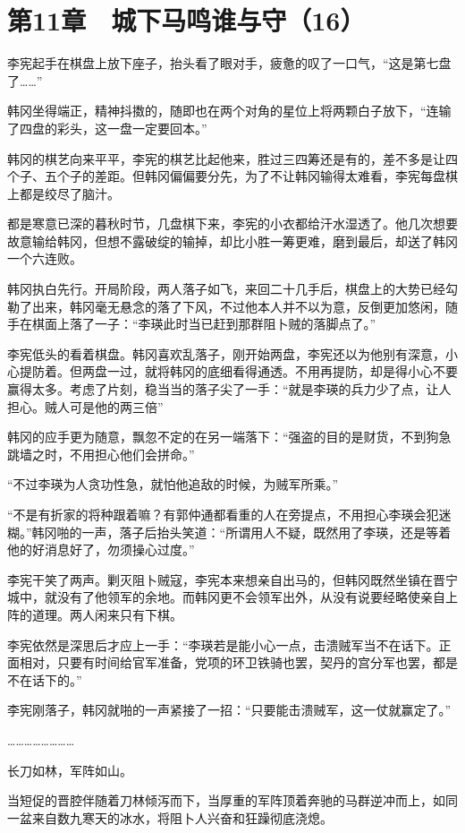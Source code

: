 \section{第11章　城下马鸣谁与守（16）}

李宪起手在棋盘上放下座子，抬头看了眼对手，疲惫的叹了一口气，“这是第七盘了……”

韩冈坐得端正，精神抖擞的，随即也在两个对角的星位上将两颗白子放下，“连输了四盘的彩头，这一盘一定要回本。”

韩冈的棋艺向来平平，李宪的棋艺比起他来，胜过三四筹还是有的，差不多是让四个子、五个子的差距。但韩冈偏偏要分先，为了不让韩冈输得太难看，李宪每盘棋上都是绞尽了脑汁。

都是寒意已深的暮秋时节，几盘棋下来，李宪的小衣都给汗水湿透了。他几次想要故意输给韩冈，但想不露破绽的输掉，却比小胜一筹更难，磨到最后，却送了韩冈一个六连败。

韩冈执白先行。开局阶段，两人落子如飞，来回二十几手后，棋盘上的大势已经勾勒了出来，韩冈毫无悬念的落了下风，不过他本人并不以为意，反倒更加悠闲，随手在棋面上落了一子：“李瑛此时当已赶到那群阻卜贼的落脚点了。”

李宪低头的看着棋盘。韩冈喜欢乱落子，刚开始两盘，李宪还以为他别有深意，小心提防着。但两盘一过，就将韩冈的底细看得通透。不用再提防，却是得小心不要赢得太多。考虑了片刻，稳当当的落子尖了一手：“就是李瑛的兵力少了点，让人担心。贼人可是他的两三倍”

韩冈的应手更为随意，飘忽不定的在另一端落下：“强盗的目的是财货，不到狗急跳墙之时，不用担心他们会拼命。”

“不过李瑛为人贪功性急，就怕他追敌的时候，为贼军所乘。”

“不是有折家的将种跟着嘛？有郭仲通都看重的人在旁提点，不用担心李瑛会犯迷糊。”韩冈啪的一声，落子后抬头笑道：“所谓用人不疑，既然用了李瑛，还是等着他的好消息好了，勿须操心过度。”

李宪干笑了两声。剿灭阻卜贼寇，李宪本来想亲自出马的，但韩冈既然坐镇在晋宁城中，就没有了他领军的余地。而韩冈更不会领军出外，从没有说要经略使亲自上阵的道理。两人闲来只有下棋。

李宪依然是深思后才应上一手：“李瑛若是能小心一点，击溃贼军当不在话下。正面相对，只要有时间给官军准备，党项的环卫铁骑也罢，契丹的宫分军也罢，都是不在话下的。”

李宪刚落子，韩冈就啪的一声紧接了一招：“只要能击溃贼军，这一仗就赢定了。”

……………………

长刀如林，军阵如山。

当短促的晋腔伴随着刀林倾泻而下，当厚重的军阵顶着奔驰的马群逆冲而上，如同一盆来自数九寒天的冰水，将阻卜人兴奋和狂躁彻底浇熄。

